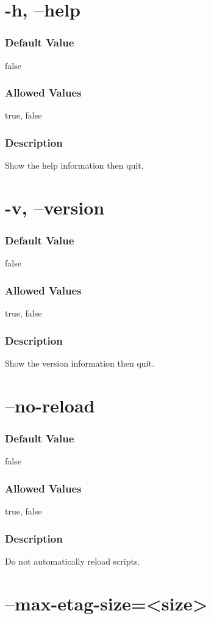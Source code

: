 \documentclass[a4paper,11pt]{report}
\begin{document}
\section{-h, --help}
\subsubsection{Default Value}{false}
\subsubsection{Allowed Values}{true, false}
\subsubsection{Description}{Show the help information then quit.}

\section{-v, --version}
\subsubsection{Default Value}{false}
\subsubsection{Allowed Values}{true, false}
\subsubsection{Description}{Show the version information then quit.}

\section{--no-reload}
\subsubsection{Default Value}{false}
\subsubsection{Allowed Values}{true, false}
\subsubsection{Description}{Do not automatically reload scripts.}

\section{--max-etag-size=<size>}
\end{document}
